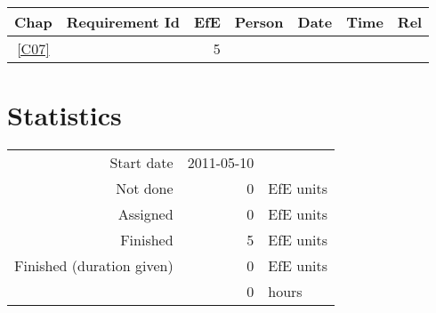 {\small \begin{longtable}{|c|p{5.5cm}||r|l|l|r|r|} \hline
\textbf{Chap} & \textbf{Requirement Id} & \textbf{EfE} & \textbf{Person} & \textbf{Date} & \textbf{Time} & \textbf{Rel} \\ \hline\endhead
\ref{C07} & \nameref{C07} & 5 & \  &  & \  & \  \\ \hline
\end{longtable}}\section{Statistics}
\begin{longtable}{rrl}
Start date & 2011-05-10 & \\ 
Not done & 0 & EfE units \\ 
Assigned & 0 & EfE units \\ 
Finished & 5 & EfE units \\ 
Finished (duration given) & 0 & EfE units \\ 
 & 0 & hours \\ 
\end{longtable}